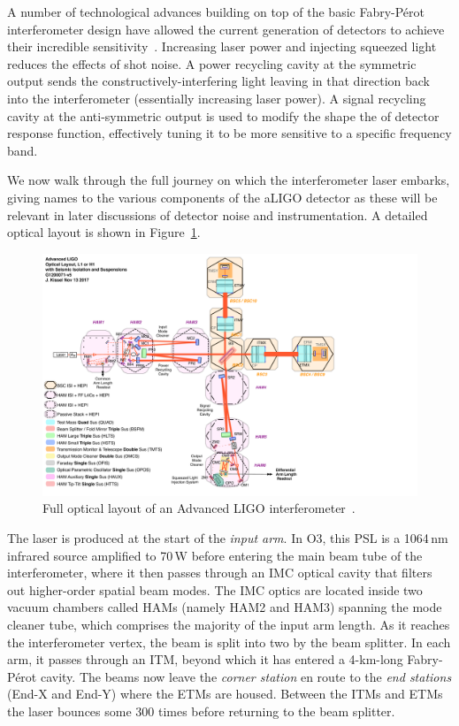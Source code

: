 A number of technological advances building on top of the basic Fabry-P\'erot interferometer design have allowed the current generation of detectors to achieve their incredible sensitivity~\citep{aLIGO_design}.
Increasing laser power and injecting squeezed light reduces the effects of shot noise.
A power recycling cavity at the symmetric output sends the constructively-interfering light leaving in that direction back into the interferometer (essentially increasing laser power).
A signal recycling cavity at the anti-symmetric output is used to modify the shape the of detector response function, effectively tuning it to be more sensitive to a specific frequency band.

We now walk through the full journey on which the interferometer laser embarks, giving names to the various components of the aLIGO detector as these will be relevant in later discussions of detector noise and instrumentation.
A detailed optical layout is shown in Figure~\ref{fig:detectors-layout}.

\begin{figure}[htb]
  \centering
  \includegraphics[trim={0 0 9cm 0}, clip, width=\textwidth]{figures/detectors/layout.pdf}
  \caption{Full optical layout of an Advanced LIGO interferometer~\protect\citep{LIGO_layout_advanced}.}
  \label{fig:detectors-layout}
\end{figure}

The laser is produced at the start of the \textit{input arm}.
In O3, this \ac{PSL} is a 1064\,nm infrared source amplified to 70\,W before entering the main beam tube of the interferometer, where it then passes through an \ac{IMC} optical cavity that filters out higher-order spatial beam modes.
The \ac{IMC} optics are located inside two vacuum chambers called \acp{HAM} (namely HAM2 and HAM3) spanning the mode cleaner tube, which comprises the majority of the input arm length.
As it reaches the interferometer vertex, the beam is split into two by the beam splitter.
In each arm, it passes through an \ac{ITM}, beyond which it has entered a 4-km-long Fabry-P\'erot cavity.
The beams now leave the \textit{corner station} en route to the \textit{end stations} (End-X and End-Y) where the \acp{ETM} are housed.
Between the \acp{ITM} and \acp{ETM} the laser bounces some 300 times before returning to the beam splitter.

